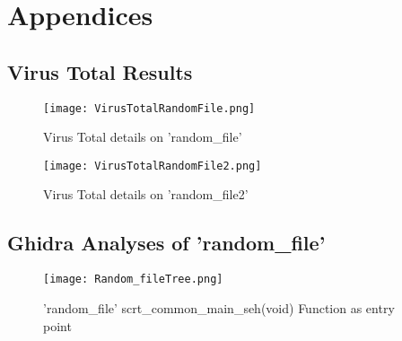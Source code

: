 \documentclass[
	letterpaper, %
	10pt, %
	unnumberedsections, %
	twoside, %
]{APAAssignment}
\begin{document}
\chapter{Appendices}
\begin{appendices}

\section{Virus Total Results}\label{app:VirusTotal}
\begin{figure}[!htp] %
	\centering
	\texttt{[image: VirusTotalRandomFile.png]}
	\caption{Virus Total details on 'random\_file'}
	\label{fig:VirusTotalRandomFile}
\end{figure}

\begin{figure}[!htp] %
	\centering
	\texttt{[image: VirusTotalRandomFile2.png]}
	\caption{Virus Total details on 'random\_file2'}
	\label{fig:VirusTotalRandomFile2}
\end{figure}
\clearpage
\section{Ghidra Analyses of 'random\_file'}\label{app:GhidraRandomFile}	
\begin{figure}[!htp] %
	\centering
	\texttt{[image: Random\_fileTree.png]}
	\caption{'random\_file' scrt\_common\_main\_seh(void) Function as entry point}
	\label{fig:GhidraRandomFileTree}
\end{figure}

\end{appendices}
\end{document}
